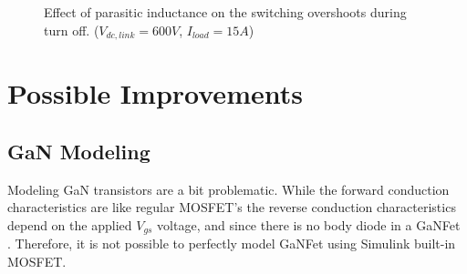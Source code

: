\documentclass[12pt]{article} %
\begin{document}
\begin{figure}[h]
     \centering
        \caption{Effect of parasitic inductance on the switching overshoots during turn off. ($V_{dc,link}=600V$, $I_{load}=15A$)}
	\label{fig:parasiticswitching_turnoff}
\end{figure}
\clearpage

\section{Possible Improvements}

\subsection{GaN Modeling}
Modeling GaN transistors are a bit problematic. While the forward conduction characteristics are like regular MOSFET's the reverse conduction characteristics depend on the applied $V_{gs}$ voltage, and since there is no body diode in a GaNFet \cite{7309716}. Therefore, it is not possible to perfectly model GaNFet using Simulink built-in MOSFET. 
\end{document}

